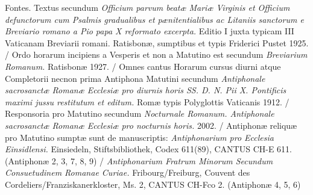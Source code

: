 \documentclass[a4paper, twoside, 12pt]{article}
\begin{document}

\vfill



\pagebreak



\pagebreak



\pagebreak



\pagebreak






\fancyhead[LE]{\thepage\ / }
\fancyhead[RO]{ / \thepage}



\pagebreak





\pagebreak



\pagestyle{empty}

\tableofcontents

\vfill


Fontes. 
Textus secundum 
\textit{Officium parvum beatæ Mariæ Virginis et Officium
defunctorum cum Psalmis gradualibus et pænitentialibus ac Litaniis sanctorum
e Breviario romano a Pio papa X reformato excerpta.}
Editio I juxta typicam III Vaticanam Breviarii romani. 
Ratisbonæ, sumptibus et typis Friderici Pustet 1925. /
Ordo horarum incipiens a Vesperis et non a Matutino est secundum
\textit{Breviarium Romanum.} Ratisbonæ 1927. /
Omnes cantus Horarum cursus diurni atque Completorii 
necnon prima Antiphona Matutini secundum
\textit{Antiphonale sacrosanctæ Romanæ Ecclesiæ pro diurnis horis
SS. D. N. Pii X. Pontificis maximi jussu restitutum et editum.}
Romæ typis Polyglottis Vaticanis 1912. /
Responsoria pro Matutino secundum 
\textit{Nocturnale Romanum. Antiphonale sacrosanctæ Romanæ Ecclesiæ
pro nocturnis horis.}
2002. /
Antiphonæ reliquæ pro Matutino sumptæ sunt de manuscriptis:
\textit{Antiphonarium pro Ecclesia Einsidlensi.}
Einsiedeln, Stiftsbibliothek, Codex 611(89), CANTUS CH-E 611.
(Antiphonæ 2, 3, 7, 8, 9) /
\textit{Antiphonarium Fratrum Minorum Secundum Consuetudinem Romanae Curiae.}
Fribourg/Freiburg, Couvent des Cordeliers/Franziskanerkloster, Ms. 2,
CANTUS CH-Fco 2.
(Antiphonæ 4, 5, 6)
\end{document}
